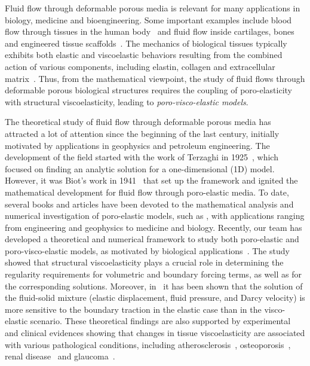 \documentclass[12pt,a4paper]{amsart}
\theoremstyle{definition}
\begin{document}
Fluid flow through deformable porous  media is relevant for many applications in
biology, medicine and bioengineering. Some important examples include blood flow through tissues in the human body~\cite{chapelle,causin}  and fluid flow inside cartilages, bones and engineered tissue scaffolds~\cite{cowin,lai,Soltz1998,Sacco2011,Causin2013}.
The mechanics of biological tissues typically exhibits both elastic and viscoelastic behaviors resulting from the combined action of various components, including elastin, collagen and extracellular
matrix~\cite{mow,nia,Ozkaya,RechaSancho2016}.
Thus, from the mathematical viewpoint, the study of fluid flows through deformable porous  biological structures requires the coupling of poro-elasticity with structural viscoelasticity, leading to \textit{poro-visco-elastic models}.

The theoretical study of fluid flow through deformable porous media has attracted a lot of attention since the beginning of the last century, initially motivated by applications in geophysics and petroleum engineering. The development of the field started with the work of Terzaghi in 1925~\cite{terzaghi}, which focused on finding an analytic solution for a one-dimensional (1D) model. However, it was Biot's work in 1941~\cite{biot} that set up the framework and ignited the mathematical development for fluid flow through poro-elastic media. To date, several books and articles have been devoted to the mathematical analysis and numerical investigation of poro-elastic models, such as \cite{Soltz1998,deBoer,coussy,detournay1,detournay2,zenisek,owczarek,show1,show2,cao,phillips,phillips2,phillips3,settari},
with  applications ranging from engineering and geophysics to medicine and biology.
%
Recently, our team has developed a theoretical and numerical framework to study both poro-elastic and poro-visco-elastic models, as
motivated by biological applications~\cite{ARMA}. The study showed that structural viscoelasticity plays a crucial role in determining the regularity requirements for volumetric and boundary forcing terms, as well as for the  corresponding solutions. Moreover, in~\cite{BBBNG} it has been shown that the solution of the fluid-solid mixture (elastic displacement, fluid pressure, and Darcy velocity) is more sensitive to the boundary traction in the elastic case than in the visco-elastic scenario. These theoretical findings are
also supported by experimental and clinical evidences showing that changes in tissue viscoelasticity are associated with various pathological conditions, including atherosclerosis~\cite{osidak}, osteoporosis~\cite{augat}, renal disease~\cite{guerin} and glaucoma~\cite{downs}.
\end{document}
